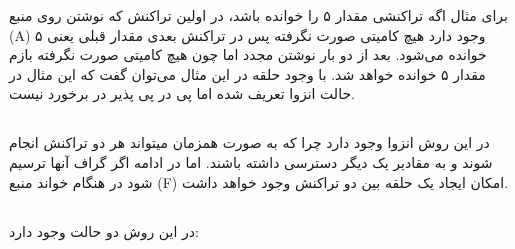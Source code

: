 \documentclass[a4paper]{article}
\begin{document}
برای مثال اگه تراکنشی مقدار ۵ را خوانده باشد، در اولین تراکنش که نوشتن روی منبع
(A) وجود دارد هیچ کامیتی صورت نگرفته پس در تراکنش بعدی مقدار قبلی یعنی ۵ خوانده
می‌شود. بعد از دو بار نوشتن مجدد اما چون هیچ کامیتی صورت نگرفته بازم مقدار ۵
خوانده خواهد شد. با وجود حلقه در این مثال می‌توان گفت که این مثال در حالت انزوا
تعریف شده اما پی در پی پذیر در برخورد نیست.

\newpage

\subsection{}

\begin{LTR}
    \begin{table}[h]
        \centering
    \end{table}
\end{LTR}

در این روش انزوا وجود دارد چرا که به صورت همزمان میتواند هر دو تراکنش انجام شوند
و به مقادیر یک دیگر دسترسی داشته باشند. اما در ادامه اگر گراف آنها ترسیم شود در
هنگام خواند منبع (F) امکان ایجاد یک حلقه بین دو تراکنش وجود خواهد داشت.

\subsection{}

در این روش دو حالت وجود دارد:
\end{document}
